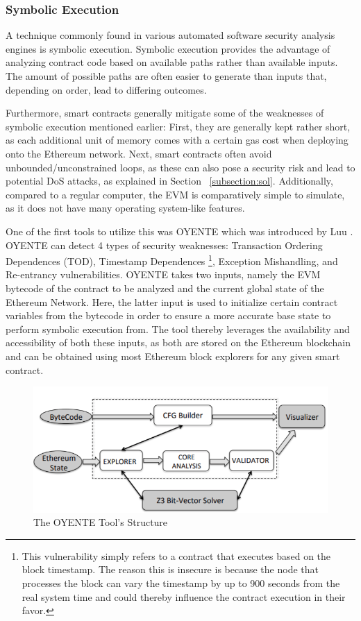 \documentclass[letterpaper,twocolumn,10pt]{article}
\begin{document}
\subsubsection{Symbolic Execution}
A technique commonly found in various automated software security analysis engines is symbolic execution. Symbolic execution provides the advantage of analyzing contract code based on available paths rather than available inputs. The amount of possible paths are often easier to generate than inputs that, depending on order, lead to differing outcomes. 

Furthermore, smart contracts generally mitigate some of the weaknesses of symbolic execution mentioned earlier: First, they are generally kept rather short, as each additional unit of memory comes with a certain gas cost when deploying onto the Ethereum network. Next, smart contracts often avoid unbounded/unconstrained loops, as these can also pose a security risk and lead to potential DoS attacks, as explained in Section ~\ref{subsection:sol}. Additionally, compared to a regular computer, the EVM is comparatively simple to simulate, as it does not have many operating system-like features.


One of the first tools to utilize this was OYENTE which was introduced by Luu \cite{luu_chu_olickel_saxena_hobor_2016}. OYENTE can detect 4 types of security weaknesses: Transaction Ordering Dependences (TOD), Timestamp Dependences \footnote{This vulnerability simply refers to a contract that executes based on the block timestamp. The reason this is insecure is because the node that processes the block can vary the timestamp by up to 900 seconds from the real system time and could thereby influence the contract execution in their favor.}, Exception Mishandling, and Re-entrancy vulnerabilities. OYENTE takes two inputs, namely the EVM bytecode of the contract to be analyzed and the current global state of the Ethereum Network. Here, the latter input is used to initialize certain contract variables from the bytecode in order to ensure a more accurate base state to perform symbolic execution from. The tool thereby leverages the availability and accessibility of both these inputs, as both are stored on the Ethereum blockchain and can be obtained using most Ethereum block explorers for any given smart contract.

\begin{figure}
\begin{center}
\includegraphics[scale=0.35]{oyente}
\end{center}
\caption{\label{fig:oyente} The OYENTE Tool's Structure}
\end{figure}
\end{document}
